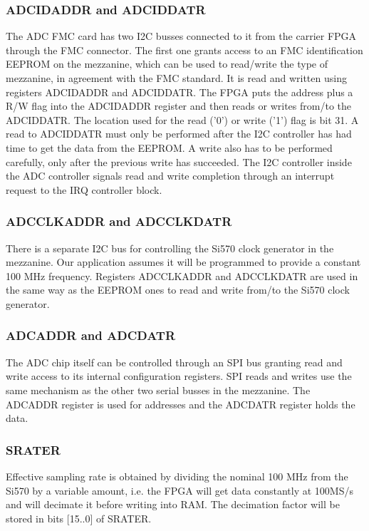 \documentclass{article}
\begin{document}
\subsubsection{ADCIDADDR and ADCIDDATR}
The ADC FMC card has two I2C busses connected to it from the carrier FPGA through the FMC connector. The first one grants access to an FMC identification EEPROM on the mezzanine, which can be used to read/write the type of mezzanine, in agreement with the FMC standard. It is read and written using registers ADCIDADDR and ADCIDDATR. The FPGA puts the address plus a R/W flag into the ADCIDADDR register and then reads or writes from/to the ADCIDDATR. The location used for the read ('0') or write ('1') flag is bit 31. A read to ADCIDDATR must only be performed after the I2C controller has had time to get the data from the EEPROM. A write also has to be performed carefully, only after the previous write has succeeded. The I2C controller inside the ADC controller signals read and write completion through an interrupt request to the IRQ controller block. 

\subsubsection{ADCCLKADDR and ADCCLKDATR}
There is a separate I2C bus for controlling the Si570 clock generator in the mezzanine. Our application assumes it will be programmed to provide a constant 100 MHz frequency. Registers ADCCLKADDR and ADCCLKDATR are used in the same way as the EEPROM ones to read and write from/to the Si570 clock generator. 

\subsubsection{ADCADDR and ADCDATR}
The ADC chip itself can be controlled through an SPI bus granting read and write access to its internal configuration registers. SPI reads and writes use the same mechanism as the other two serial busses in the mezzanine. The ADCADDR register is used for addresses and the ADCDATR register holds the data.

\subsubsection{SRATER}
Effective sampling rate is obtained by dividing the nominal 100 MHz from the Si570 by a variable amount, i.e. the FPGA will get data constantly at 100MS/s and will decimate it before writing into RAM. The decimation factor will be stored in bits [15..0] of SRATER.
\end{document}
